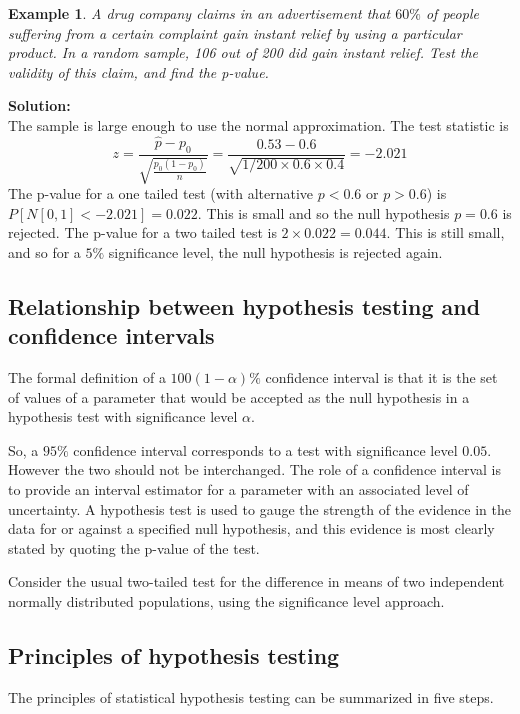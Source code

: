 \documentclass[12pt]{article}
\theoremstyle{break}
\newtheorem{example}[theorem]{Example}
\begin{document}
\begin{example}
A drug company claims in an advertisement that $60\%$ of people suffering from a certain complaint gain instant relief by using a particular product. In a random sample, 106 out of 200 did gain instant relief. Test the validity of this claim, and find the p-value.
\end{example}

\begin{mdframed}
{\bf Solution:}\\
The sample is large enough to use the normal approximation. The test statistic is $$z=\frac{\hat{p}-p_0}{\sqrt{\frac{p_0(1-p_0)}{n}}}=\frac{0.53-0.6}{\sqrt{1/200 \times 0.6 \times 0.4}}=-2.021$$
The p-value for a one tailed test (with alternative $p<0.6$ or $p>0.6$) is $P[N[0,1]<-2.021]=0.022$. This is small and so the null hypothesis $p=0.6$ is rejected. The p-value for a two tailed test is $2 \times 0.022=0.044$. This is still small, and so for a $5\%$ significance level, the null hypothesis is rejected again.
\end{mdframed}

\subsection{Relationship between hypothesis testing and confidence intervals}
The formal definition of a $100(1-\alpha)\%$ confidence interval is that it is the set of values of a parameter that would be accepted as the null hypothesis in a hypothesis test with significance level $\alpha.$

So, a $95\%$ confidence interval corresponds to a test with significance level $0.05.$ However the two should not be interchanged. The role of a confidence interval is to provide an interval estimator for a parameter with an associated level of uncertainty. A hypothesis test is used to gauge the strength of the evidence in the data for or against a specified null hypothesis, and this evidence is most clearly stated by quoting the p-value of the test.

\begin{mdframed}
Consider the usual two-tailed test for the difference in means of two independent normally distributed populations, using the significance level approach.
\textcolor[rgb]{1.00,1.00,1.00}{\lipsum[1-6]}
\end{mdframed}


\subsection{Principles of hypothesis testing}
The principles of statistical hypothesis testing can be summarized in five steps.
\end{document}
